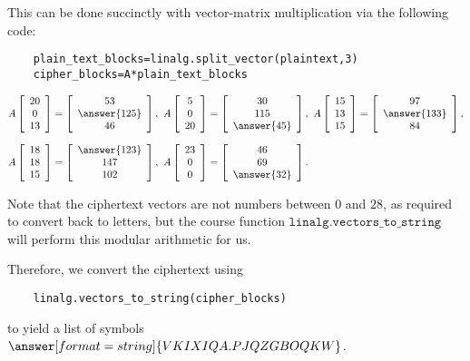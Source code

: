 \documentclass{ximera}
\begin{document}
\begin{example}
\begin{solution}
  This can be done succinctly with vector-matrix multiplication via the following code:

  \begin{verbatim}
    plain_text_blocks=linalg.split_vector(plaintext,3)
    cipher_blocks=A*plain_text_blocks
  \end{verbatim}


  \begin{align*}
    &A \startmat{c} 20 \\ 0 \\ 13 \stopmat
    = \startmat{c} 53\\\answer{125}\\46 \stopmat,
    \quad
    A \startmat{c} 5 \\ 0 \\ 20 \stopmat
    = \startmat{c} 30\\115\\\answer{45} \stopmat,
    \quad
    A \startmat{c} 15 \\ 13 \\ 15 \stopmat
    = \startmat{c} 97\\\answer{133}\\84 \stopmat,
    \\\\[-2ex]
    &A \startmat{c} 18 \\ 18 \\ 15 \stopmat
    = \startmat{c} \answer{123}\\147\\102 \stopmat,
    \quad
    A \startmat{c} 23 \\ 0 \\ 0 \stopmat
    = \startmat{c} 46\\69\\\answer{32} \stopmat.
  \end{align*}

  Note that the ciphertext vectors are not numbers between $0$ and $28$, as required to convert back to letters, but the course function $\texttt{linalg.vectors\_to\_string}$ will perform this modular arithmetic for us.
  
  Therefore, we convert the ciphertext using 

  \begin{verbatim}
    linalg.vectors_to_string(cipher_blocks)
  \end{verbatim}
  
  to yield a list of symbols
  $\answer[format=string]{VKIXIQA.PJQZGBOQKW}$.
\end{solution}
\end{example}
\end{document}

